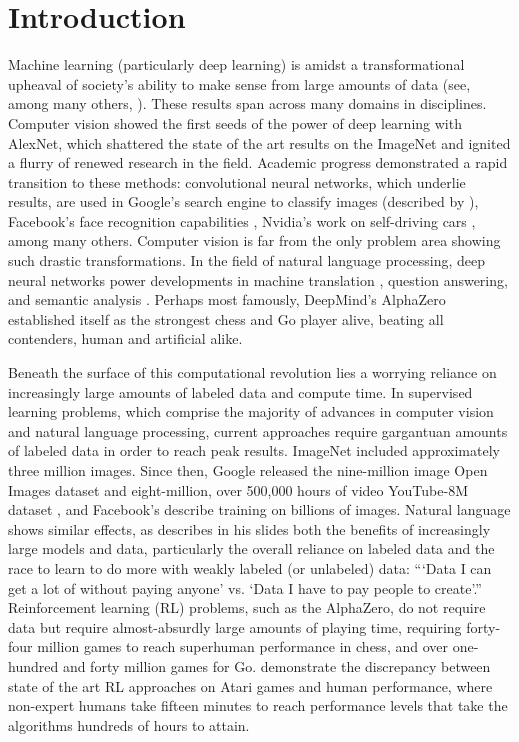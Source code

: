 \chapter{Introduction\label{ch:intro}}

Machine learning (particularly deep learning) is amidst a transformational upheaval of society’s ability to make sense from large amounts of data (see, among many others, \cite{Sejnowski2018}). These results span across many domains in disciplines. Computer vision showed the first seeds of the power of deep learning with  AlexNet, which shattered the state of the art results on the ImageNet \parencite{Deng2009} and ignited a flurry of renewed research in the field. Academic progress demonstrated a rapid transition to these methods: convolutional neural networks, which underlie  results, are used in Google’s search engine to classify images (described by \cite{Marr2017}), Facebook’s face recognition capabilities \parencite{Taigman2014}, Nvidia’s work on self-driving cars \parencite{Bojarski2016}, among many others. Computer vision is far from the only problem area showing such drastic transformations. In the field of natural language processing, deep neural networks power developments in machine translation \parencite{Wu2016a}, question answering, and semantic analysis \parencite{Devlin2018a}. Perhaps most famously, DeepMind’s AlphaZero \parencite{Silver2018} established itself as the strongest chess and Go player alive, beating all contenders, human and artificial alike.  

Beneath the surface of this computational revolution lies a worrying reliance on increasingly large amounts of labeled data and compute time. In supervised learning problems, which comprise the majority of advances in computer vision and natural language processing, current approaches require gargantuan amounts of labeled data in order to reach peak results.  ImageNet included approximately three million images. Since then, Google released the nine-million image Open Images dataset \parencite{Kuznetsova2018} and eight-million, over 500,000 hours of video YouTube-8M dataset \parencite{Abu-El-Haija2016}, and Facebook's \textcite{Mahajan2018} describe training on billions of images. Natural language shows similar effects, as \textcite{Devlin2018} describes in his slides both the benefits of increasingly large models and data, particularly the overall reliance on labeled data and the race to learn to do more with weakly labeled (or unlabeled) data: ```Data I can get a lot of without paying anyone' vs. `Data I have to pay people to create'.'' Reinforcement learning (RL) problems, such as the AlphaZero, do not require data but require almost-absurdly large amounts of playing time, requiring forty-four million games to reach superhuman performance in chess, and over one-hundred and forty million games for Go. \textcite{Lake2017} demonstrate the discrepancy between state of the art RL approaches on Atari games and human performance, where non-expert humans take fifteen minutes to reach performance levels that take the algorithms hundreds of hours to attain. 
 
